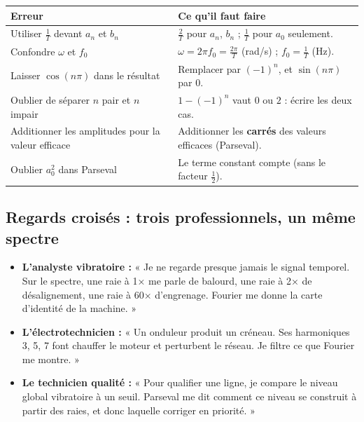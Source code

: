 \documentclass[a4paper,11pt]{article}
\begin{document}
\begin{center}
\renewcommand{\arraystretch}{1.4}
\begin{tabular}{|p{6.8cm}|p{8.6cm}|}
\hline
\rowcolor{uimmlightblue}
\textbf{Erreur} & \textbf{Ce qu'il faut faire} \\
\hline
Utiliser $\frac1T$ devant $a_n$ et $b_n$ & $\frac2T$ pour $a_n$, $b_n$ ; $\frac1T$ pour $a_0$ seulement. \\
\hline
Confondre $\omega$ et $f_0$ & $\omega = 2\pi f_0 = \frac{2\pi}{T}$ (rad/s) ; $f_0 = \frac1T$ (Hz). \\
\hline
Laisser $\cos(n\pi)$ dans le résultat & Remplacer par $(-1)^n$, et $\sin(n\pi)$ par $0$. \\
\hline
Oublier de séparer $n$ pair et $n$ impair & $1-(-1)^n$ vaut $0$ ou $2$ : écrire les deux cas. \\
\hline
Additionner les amplitudes pour la valeur efficace & Additionner les \textbf{carrés} des valeurs efficaces (Parseval). \\
\hline
Oublier $a_0^2$ dans Parseval & Le terme constant compte (sans le facteur $\frac12$). \\
\hline
\end{tabular}
\end{center}

\subsection{Regards croisés : trois professionnels, un même spectre}\label{subsec:regards}

\begin{remarque}
\begin{itemize}
  \item \textbf{L'analyste vibratoire :} « Je ne regarde presque jamais le signal temporel. Sur le spectre, une raie à 1× me parle de balourd, une raie à 2× de désalignement, une raie à $60$× d'engrenage. Fourier me donne la carte d'identité de la machine. »
  \item \textbf{L'électrotechnicien :} « Un onduleur produit un créneau. Ses harmoniques 3, 5, 7 font chauffer le moteur et perturbent le réseau. Je filtre ce que Fourier me montre. »
  \item \textbf{Le technicien qualité :} « Pour qualifier une ligne, je compare le niveau global vibratoire à un seuil. Parseval me dit comment ce niveau se construit à partir des raies, et donc laquelle corriger en priorité. »
\end{itemize}
\end{remarque}
\end{document}

